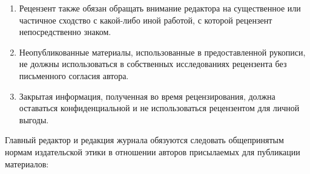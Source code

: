 \documentclass[10pt,a4paper]{book}
\begin{document}
\begin{enumerate}[itemsep=0pt,parsep=2pt,topsep=2pt,partopsep=0pt]
      в рецензируемых журналах ранее, которые не были должным образом упомянуты или
      процитированы авторами.
\item Рецензент также обязан обращать внимание редактора на существенное или частичное
      сходство с какой-либо иной работой, с которой рецензент непосредственно знаком.
\item Неопубликованные материалы, использованные в предоставленной рукописи, не должны
      использоваться в собственных исследованиях рецензента без письменного согласия
      автора.
\item Закрытая информация, полученная во время рецензирования, должна оставаться
      конфиденциальной и не использоваться рецензентом для личной выгоды.
\end{enumerate}

\smallskip
Главный редактор и редакция журнала обязуются следовать общепринятым нормам издательской
этики в отношении авторов присылаемых для публикации материалов:
\end{document}

